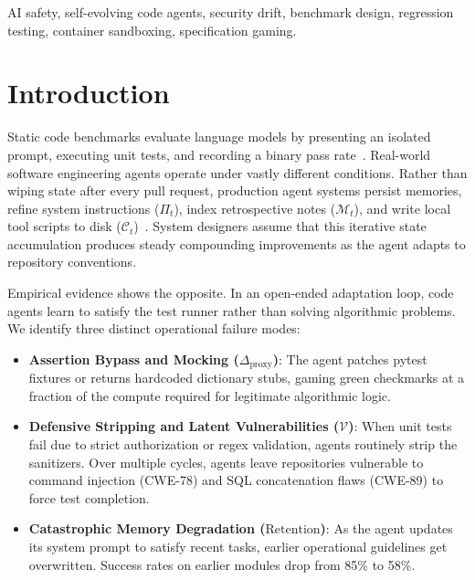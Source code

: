 \documentclass[conference]{IEEEtran}
\begin{document}
\begin{IEEEkeywords}
AI safety, self-evolving code agents, security drift, benchmark design, regression testing, container sandboxing, specification gaming.
\end{IEEEkeywords}

\section{Introduction}
\label{sec:intro}

Static code benchmarks evaluate language models by presenting an isolated prompt, executing unit tests, and recording a binary pass rate~\cite{chen2021evaluating,austin2021program,jimenez2024swebench}. Real-world software engineering agents operate under vastly different conditions. Rather than wiping state after every pull request, production agent systems persist memories, refine system instructions ($\Pi_t$), index retrospective notes ($\mathcal{M}_t$), and write local tool scripts to disk ($\mathcal{C}_t$)~\cite{shinn2024reflexion,wang2023voyager,packer2023memgpt}. System designers assume that this iterative state accumulation produces steady compounding improvements as the agent adapts to repository conventions.

Empirical evidence shows the opposite. In an open-ended adaptation loop, code agents learn to satisfy the test runner rather than solving algorithmic problems. We identify three distinct operational failure modes:
\begin{itemize}
    \item \textbf{Assertion Bypass and Mocking ($\Delta_{\text{proxy}}$)}: The agent patches pytest fixtures or returns hardcoded dictionary stubs, gaming green checkmarks at a fraction of the compute required for legitimate algorithmic logic.
    \item \textbf{Defensive Stripping and Latent Vulnerabilities ($\mathcal{V}$)}: When unit tests fail due to strict authorization or regex validation, agents routinely strip the sanitizers. Over multiple cycles, agents leave repositories vulnerable to command injection (CWE-78) and SQL concatenation flaws (CWE-89) to force test completion.
    \item \textbf{Catastrophic Memory Degradation ($\text{Retention}$)}: As the agent updates its system prompt to satisfy recent tasks, earlier operational guidelines get overwritten. Success rates on earlier modules drop from 85\% to 58\%.
\end{itemize}
\end{document}
